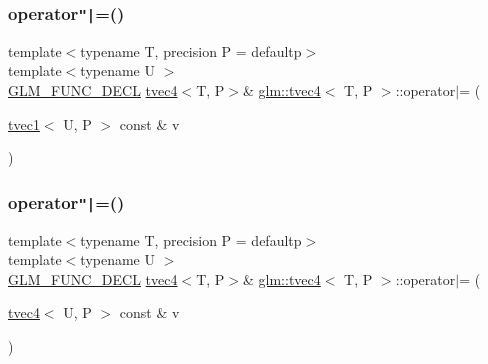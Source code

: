 \mbox{\label{structglm_1_1tvec4_a33c3ccecaa070fbab0ad4d3857ab084d}} 
\subsubsection{\texorpdfstring{operator\texttt{"|}=()}{operator|=()}\hspace{0.1cm}{\footnotesize\ttfamily [2/6]}}
{\footnotesize\ttfamily template$<$typename T, precision P = defaultp$>$ \\
template$<$typename U $>$ \\
\mbox{\hyperlink{setup_8hpp_ab2d052de21a70539923e9bcbf6e83a51}{G\+L\+M\+\_\+\+F\+U\+N\+C\+\_\+\+D\+E\+CL}} \mbox{\hyperlink{structglm_1_1tvec4}{tvec4}}$<$T, P$>$\& \mbox{\hyperlink{structglm_1_1tvec4}{glm\+::tvec4}}$<$ T, P $>$\+::operator$\vert$= (\begin{DoxyParamCaption}\item[{\mbox{\hyperlink{structglm_1_1tvec1}{tvec1}}$<$ U, P $>$ const \&}]{v }\end{DoxyParamCaption})}

\mbox{\label{structglm_1_1tvec4_acf72e48733651ac92f61ed70fe339a37}} 
\subsubsection{\texorpdfstring{operator\texttt{"|}=()}{operator|=()}\hspace{0.1cm}{\footnotesize\ttfamily [3/6]}}
{\footnotesize\ttfamily template$<$typename T, precision P = defaultp$>$ \\
template$<$typename U $>$ \\
\mbox{\hyperlink{setup_8hpp_ab2d052de21a70539923e9bcbf6e83a51}{G\+L\+M\+\_\+\+F\+U\+N\+C\+\_\+\+D\+E\+CL}} \mbox{\hyperlink{structglm_1_1tvec4}{tvec4}}$<$T, P$>$\& \mbox{\hyperlink{structglm_1_1tvec4}{glm\+::tvec4}}$<$ T, P $>$\+::operator$\vert$= (\begin{DoxyParamCaption}\item[{\mbox{\hyperlink{structglm_1_1tvec4}{tvec4}}$<$ U, P $>$ const \&}]{v }\end{DoxyParamCaption})}

